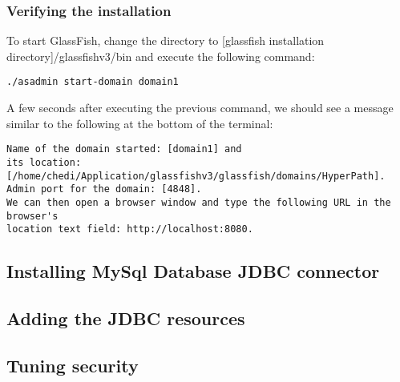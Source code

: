\subsubsection{Verifying the installation}
To start GlassFish, change the directory to [glassfish installation directory]/glassfishv3/bin and execute the following command: \\
\begin{verbatim}
./asadmin start-domain domain1
\end{verbatim}

A few seconds after executing the previous command, we should see a message similar to the following at the bottom of the terminal: \\
\begin{verbatim}
Name of the domain started: [domain1] and
its location: [/home/chedi/Application/glassfishv3/glassfish/domains/HyperPath].
Admin port for the domain: [4848].
We can then open a browser window and type the following URL in the browser's
location text field: http://localhost:8080.
\end{verbatim}

\subsection{Installing MySql Database JDBC connector}
\subsection{Adding the JDBC resources}
\subsection{Tuning security}